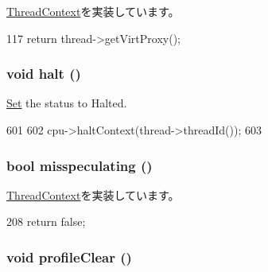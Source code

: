 \hyperlink{classThreadContext_a55e3a4b93d5f1ad641247f6d223191c6}{ThreadContext}を実装しています。


\begin{DoxyCode}
117         { return thread->getVirtProxy(); }
\end{DoxyCode}
\hypertarget{classOzoneCPU_1_1OzoneTC_ade0430439247877006d7df950f94918a}{
\subsubsection[{halt}]{\setlength{\rightskip}{0pt plus 5cm}void halt ()}}
\label{classOzoneCPU_1_1OzoneTC_ade0430439247877006d7df950f94918a}


\hyperlink{classSet}{Set} the status to Halted. 


\begin{DoxyCode}
601 {
602     cpu->haltContext(thread->threadId());
603 }
\end{DoxyCode}
\hypertarget{classOzoneCPU_1_1OzoneTC_a99768639c728ee835cce54b8b42b3d8f}{
\subsubsection[{misspeculating}]{\setlength{\rightskip}{0pt plus 5cm}bool misspeculating ()}}
\label{classOzoneCPU_1_1OzoneTC_a99768639c728ee835cce54b8b42b3d8f}


\hyperlink{classThreadContext_a6b21c2b589ae3065643986e1c3e5f6fa}{ThreadContext}を実装しています。


\begin{DoxyCode}
208 { return false; }
\end{DoxyCode}
\hypertarget{classOzoneCPU_1_1OzoneTC_acf9c88860776d7bd752317e8b550a5d5}{
\subsubsection[{profileClear}]{\setlength{\rightskip}{0pt plus 5cm}void profileClear ()}}
\label{classOzoneCPU_1_1OzoneTC_acf9c88860776d7bd752317e8b550a5d5}


